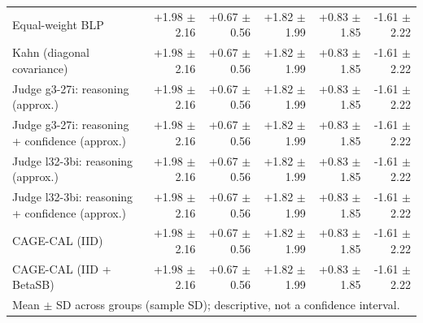 \begin{tabular}{lrrrrr}
Equal-weight BLP & +1.98 {\scriptsize $\pm$ 2.16} & +0.67 {\scriptsize $\pm$ 0.56} & +1.82 {\scriptsize $\pm$ 1.99} & +0.83 {\scriptsize $\pm$ 1.85} & -1.61 {\scriptsize $\pm$ 2.22} \\
Kahn (diagonal covariance) & +1.98 {\scriptsize $\pm$ 2.16} & +0.67 {\scriptsize $\pm$ 0.56} & +1.82 {\scriptsize $\pm$ 1.99} & +0.83 {\scriptsize $\pm$ 1.85} & -1.61 {\scriptsize $\pm$ 2.22} \\
Judge g3-27i: reasoning (approx.) & +1.98 {\scriptsize $\pm$ 2.16} & +0.67 {\scriptsize $\pm$ 0.56} & +1.82 {\scriptsize $\pm$ 1.99} & +0.83 {\scriptsize $\pm$ 1.85} & -1.61 {\scriptsize $\pm$ 2.22} \\
Judge g3-27i: reasoning + confidence (approx.) & +1.98 {\scriptsize $\pm$ 2.16} & +0.67 {\scriptsize $\pm$ 0.56} & +1.82 {\scriptsize $\pm$ 1.99} & +0.83 {\scriptsize $\pm$ 1.85} & -1.61 {\scriptsize $\pm$ 2.22} \\
Judge l32-3bi: reasoning (approx.) & +1.98 {\scriptsize $\pm$ 2.16} & +0.67 {\scriptsize $\pm$ 0.56} & +1.82 {\scriptsize $\pm$ 1.99} & +0.83 {\scriptsize $\pm$ 1.85} & -1.61 {\scriptsize $\pm$ 2.22} \\
Judge l32-3bi: reasoning + confidence (approx.) & +1.98 {\scriptsize $\pm$ 2.16} & +0.67 {\scriptsize $\pm$ 0.56} & +1.82 {\scriptsize $\pm$ 1.99} & +0.83 {\scriptsize $\pm$ 1.85} & -1.61 {\scriptsize $\pm$ 2.22} \\
CAGE-CAL (IID) & +1.98 {\scriptsize $\pm$ 2.16} & +0.67 {\scriptsize $\pm$ 0.56} & +1.82 {\scriptsize $\pm$ 1.99} & +0.83 {\scriptsize $\pm$ 1.85} & -1.61 {\scriptsize $\pm$ 2.22} \\
CAGE-CAL (IID + BetaSB) & +1.98 {\scriptsize $\pm$ 2.16} & +0.67 {\scriptsize $\pm$ 0.56} & +1.82 {\scriptsize $\pm$ 1.99} & +0.83 {\scriptsize $\pm$ 1.85} & -1.61 {\scriptsize $\pm$ 2.22} \\
\bottomrule
\multicolumn{6}{l}{\scriptsize Mean $\pm$ SD across groups (sample SD); descriptive, not a confidence interval.} \\
\end{tabular}
